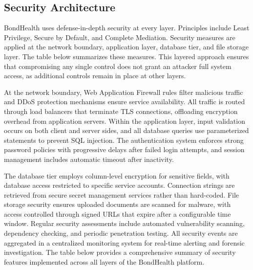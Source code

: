 \subsection{Security Architecture}

\justifying
\noindent BondHealth uses defense-in-depth security at every layer. Principles include Least Privilege, Secure by Default, and Complete Mediation. Security measures are applied at the network boundary, application layer, database tier, and file storage layer. The table below summarizes these measures. This layered approach ensures that compromising any single control does not grant an attacker full system access, as additional controls remain in place at other layers.

\justifying
\noindent At the network boundary, Web Application Firewall rules filter malicious traffic and DDoS protection mechanisms ensure service availability. All traffic is routed through load balancers that terminate TLS connections, offloading encryption overhead from application servers. Within the application layer, input validation occurs on both client and server sides, and all database queries use parameterized statements to prevent SQL injection. The authentication system enforces strong password policies with progressive delays after failed login attempts, and session management includes automatic timeout after inactivity.

\justifying
\noindent The database tier employs column-level encryption for sensitive fields, with database access restricted to specific service accounts. Connection strings are retrieved from secure secret management services rather than hard-coded. File storage security ensures uploaded documents are scanned for malware, with access controlled through signed URLs that expire after a configurable time window. Regular security assessments include automated vulnerability scanning, dependency checking, and periodic penetration testing. All security events are aggregated in a centralized monitoring system for real-time alerting and forensic investigation. The table below provides a comprehensive summary of security features implemented across all layers of the BondHealth platform.

